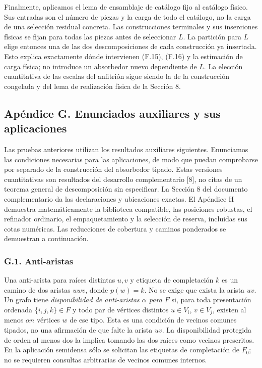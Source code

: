 \documentclass[spanish,11pt,a4paper]{article}
\begin{document}
Finalmente, aplicamos el lema de ensamblaje de catálogo fijo al catálogo físico. Sus entradas son el número de piezas y la carga de todo el catálogo, no la carga de una selección residual concreta. Las construcciones terminales y sus inserciones físicas se fijan para todas las piezas antes de seleccionar \(L\). La partición para \(L\) elige entonces una de las dos descomposiciones de cada construcción ya insertada. Esto explica exactamente dónde intervienen (F.15), (F.16) y la estimación de carga física; no introduce un absorbedor nuevo dependiente de \(L\). La elección cuantitativa de las escalas del anfitrión sigue siendo la de la construcción congelada y del lema de realización física de la Sección 8.

\subsection{Apéndice G. Enunciados auxiliares y sus aplicaciones}\label{apuxe9ndice-g.-enunciados-auxiliares-y-sus-aplicaciones}

Las pruebas anteriores utilizan los resultados auxiliares siguientes. Enunciamos las condiciones necesarias para las aplicaciones, de modo que puedan comprobarse por separado de la construcción del absorbedor tipado. Estas versiones cuantitativas son resultados del desarrollo complementario {[}8{]}, no citas de un teorema general de descomposición sin especificar. La Sección 8 del documento complementario da las declaraciones y ubicaciones exactas. El Apéndice H demuestra matemáticamente la biblioteca compatible, las posiciones robustas, el refinador ordinario, el empaquetamiento y la selección de reserva, incluidas sus cotas numéricas. Las reducciones de cobertura y caminos ponderados se demuestran a continuación.

\subsubsection{G.1. Anti-aristas}\label{g.1.-anti-aristas}

Una anti-arista para raíces distintas \(u,v\) y etiqueta de completación \(k\) es un camino de dos aristas \(uwv\), donde \(p(w)=k\). No se exige que exista la arista \(uv\). Un grafo tiene \emph{disponibilidad de anti-aristas \(\alpha\) para \(F\)} si, para toda presentación ordenada \(\{i,j,k\}\in F\) y todo par de vértices distintos \(u\in V_i\), \(v\in V_j\), existen al menos \(\alpha n\) vértices \(w\) de ese tipo. Esta es una condición de vecinos comunes tipados, no una afirmación de que falte la arista \(uv\). La disponibilidad protegida de orden al menos dos la implica tomando las dos raíces como vecinos prescritos. En la aplicación semidensa sólo se solicitan las etiquetas de completación de \(F_0\); no se requieren consultas arbitrarias de vecinos comunes internos.
\end{document}
